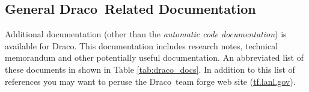 \documentclass[11pt]{nmemo}
\newcommand{\comp}[1]{\normalfont\footnotesize\texttt{#1}\normalsize}
\newcommand{\draco}{{\normalfont\sffamily Draco}}
\begin{document}



\subsection{General \draco\ Related Documentation}

Additional documentation (other than the \emph{automatic code
documentation}) is available for \draco.  This documentation includes
research notes, technical memorandum and other potentially useful
documentation.  An abbreviated list of these documents in shown in
Table \ref{tab:draco_docs}.  In addition to this list of references
you may want to peruse the \draco\ team forge web site
(\url{tf.lanl.gov}). 

\end{document}
